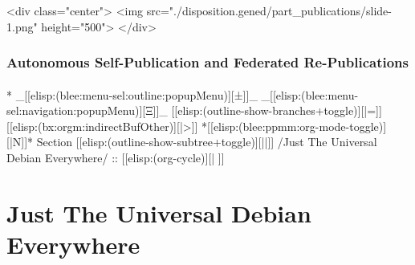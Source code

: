 \begin{whenOrg}
\begin{htmlonly}

\begin{frame}[fragile,plain,label=part_publications]
    \frametitle{}
    \framesubtitle{}
    \begin{rawhtml}
<div class="center">
<img src="./disposition.gened/part_publications/slide-1.png" height="500">
</div>
    \end{rawhtml}
\end{frame}
\end{htmlonly}

\begin{verblatex}

\begin{frame}[fragile,label=part_publications]
    \frametitle{Autonomous Self-Publication and Federated Re-Publications}
    \framesubtitle{}

    \tableofcontents


\end{frame}
\end{verblatex}


\begin{whenOrg}
*  _[[elisp:(blee:menu-sel:outline:popupMenu)][±]]_ _[[elisp:(blee:menu-sel:navigation:popupMenu)][Ξ]]_ [[elisp:(outline-show-branches+toggle)][|=]] [[elisp:(bx:orgm:indirectBufOther)][|>]] *[[elisp:(blee:ppmm:org-mode-toggle)][|N]]*  Section    [[elisp:(outline-show-subtree+toggle)][||]]   /Just The Universal Debian Everywhere/ ::  [[elisp:(org-cycle)][| ]]
\end{whenOrg}

\section{Just The Universal Debian Everywhere}


\end{whenOrg}
